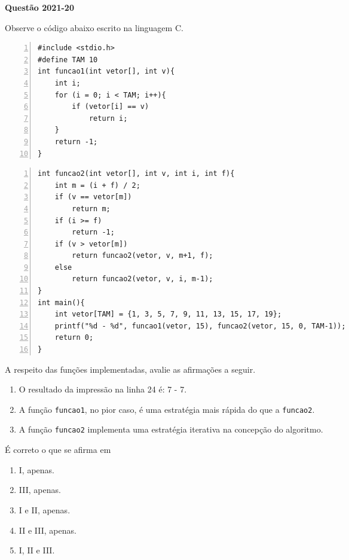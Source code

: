 \documentclass[12pt,a4paper]{article}
\newenvironment{question}[1]{%
    \pdfbookmark[3]{Questão #1}{q:#1}
    \label{q:#1}
    \bigskip\par\noindent
    \textbf{Questão #1} \dotfill
    \medskip\par\nopagebreak\noindent
    \ignorespaces
}{%
    \noindent\dotfill\medskip
}
\begin{document}
\begin{question}{2021-20}
Observe o código abaixo escrito na linguagem C.

\begin{Verbatim}[numbers=left]
#include <stdio.h>
#define TAM 10
int funcao1(int vetor[], int v){
    int i;
    for (i = 0; i < TAM; i++){
        if (vetor[i] == v)
            return i;
    }
    return -1;
}
\end{Verbatim}

\begin{Verbatim}[numbers=left,firstnumber=last]
int funcao2(int vetor[], int v, int i, int f){
    int m = (i + f) / 2;
    if (v == vetor[m])
        return m;
    if (i >= f)
        return -1;
    if (v > vetor[m])
        return funcao2(vetor, v, m+1, f);
    else
        return funcao2(vetor, v, i, m-1);
}
int main(){
    int vetor[TAM] = {1, 3, 5, 7, 9, 11, 13, 15, 17, 19};
    printf("%d - %d", funcao1(vetor, 15), funcao2(vetor, 15, 0, TAM-1));
    return 0;
}
\end{Verbatim}

A respeito das funções implementadas, avalie as afirmações a seguir.

\begin{enumerate}[label=\Roman*.]
    \item O resultado da impressão na linha 24 é: 7 - 7.
    \item A função \texttt{funcao1}, no pior caso, é uma estratégia mais rápida do que a \texttt{funcao2}.
    \item A função \texttt{funcao2} implementa uma estratégia iterativa na concepção do algoritmo.
\end{enumerate}

\noindent
É correto o que se afirma em

\begin{spacing}{0.9}
\begin{small}
\begin{enumerate}[label=\Alph*)]
    \item I, apenas.
    \item III, apenas.
    \item I e II, apenas.
    \item II e III, apenas.
    \item I, II e III.
\end{enumerate}
\end{small}
\end{spacing}
\end{question}
\end{document}
